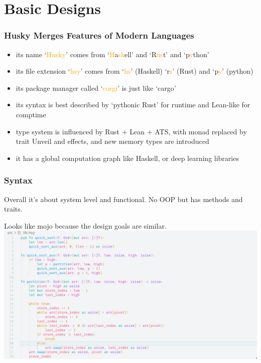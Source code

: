 \documentclass{beamer}   	%
\theoremstyle{definition}
\begin{document}
\section{Basic Designs}
\begin{frame}
\frametitle{Husky Merges Features of Modern Languages} 
\begin{itemize}
	\item its name `\textcolor{orange}{Husky}' comes from `\textcolor{orange}{H}a\textcolor{orange}{sk}ell' and `R\textcolor{orange}{us}t' and `p\textcolor{orange}{y}thon'
	\item its file extension `\textcolor{orange}{hsy}' comes from `\textcolor{orange}{hs}' (Haskell) `r\textcolor{orange}{s}' (Rust) and `p\textcolor{orange}{y}' (python)
	\item its package manager called `\textcolor{orange}{corgi}' is just like `cargo'
	\item its syntax is best described by `pythonic Rust' for runtime and Lean-like for comptime
	\item type system is influenced by Rust + Lean + ATS, with monad replaced by trait Unveil and effects, and new memory types are introduced
	\item it has a global computation graph like Haskell, or deep learning libraries
\end{itemize}
\end{frame}

\begin{frame}
\frametitle{Syntax}

Overall it's about system level and functional. No OOP but has methods and traits.

Looks like mojo because the design goals are similar.
\includegraphics[width=\linewidth]{snapshots/husky_quick_sort.png}
\end{frame}
\end{document}
